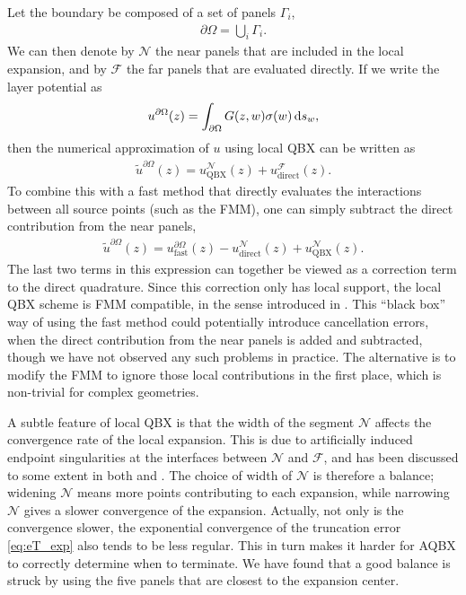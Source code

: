\documentclass[hidelinks]{siamart1116}
\begin{document}
Let the boundary be composed of a set of panels $\Gamma_i$,
\begin{align}
  {{\partial\Omega}} = \bigcup_i \Gamma_i .
\end{align}
We can then denote by ${{\mathcal N}}$ the near panels that are included in the
local expansion, and by ${{\mathcal F}}$ the far panels that are evaluated
directly. If we write the layer potential as
\begin{align}
  u^{{\partial\Omega}}(z) = \int_{{\partial\Omega}} G(z, w) {\sigma}(w) \dif s_w,
\end{align}
then the numerical approximation of $u$ using local QBX can be written
as
\begin{align}
  \tilde u^{{\partial\Omega}}(z) = 
  u_{\text{QBX}}^{{\mathcal N}}(z) + u_{\text{direct}}^{{\mathcal F}}(z) .
\end{align}
To combine this with a fast method that directly evaluates the
interactions between all source points (such as the FMM), one can
simply subtract the direct contribution from the near panels,
\begin{align}
  \tilde u^{{\partial\Omega}}(z) = 
  u_{\text{fast}}^{{\partial\Omega}}(z) - u_{\text{direct}}^{{\mathcal N}}(z) + u_{\text{QBX}}^{{\mathcal N}}(z) .  
\end{align}
The last two terms in this expression can together be viewed as a
correction term to the direct quadrature. Since this correction only
has local support, the local QBX scheme is FMM compatible, in the
sense introduced in \cite{Hao2014}. This ``black box'' way of using
the fast method could potentially introduce cancellation errors, when
the direct contribution from the near panels is added and subtracted,
though we have not observed any such problems in practice. The
alternative is to modify the FMM to ignore those local contributions
in the first place, which is non-trivial for complex geometries.

A subtle feature of local QBX is that the width of the segment ${{\mathcal N}}$
affects the convergence rate of the local expansion. This is due to
artificially induced endpoint singularities at the interfaces between
${{\mathcal N}}$ and ${{\mathcal F}}$, and has been discussed to some extent in both
\cite{Barnett2014} and \cite{Rachh2015a}. The choice of width of
${{\mathcal N}}$ is therefore a balance; widening ${{\mathcal N}}$ means more points
contributing to each expansion, while narrowing ${{\mathcal N}}$ gives a slower
convergence of the expansion. Actually, not only is the convergence
slower, the exponential convergence of the truncation error
\eqref{eq:eT_exp} also tends to be less regular. This in turn makes it
harder for AQBX to correctly determine when to terminate. We have
found that a good balance is struck by using the five panels that are
closest to the expansion center.
\end{document}

